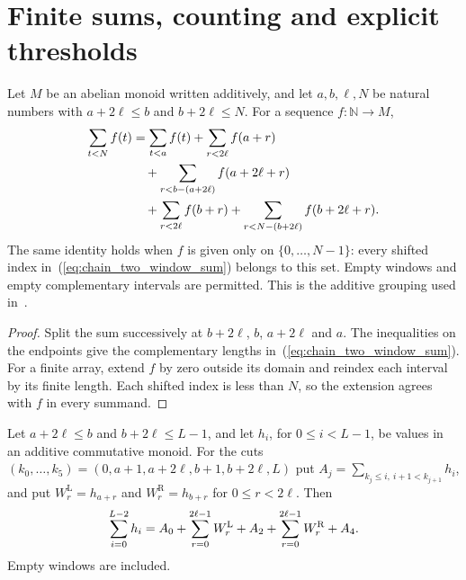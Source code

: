 \section{Finite sums, counting and explicit thresholds}

\begin{lemma}
    \label{thm:chain_two_window_sum}
    \leanok
    Let $M$ be an abelian monoid written additively, and let
    $a,b,\ell,N$ be natural numbers with $a+2\ell\le b$ and
    $b+2\ell\le N$. For a sequence $f:\mathbb N\to M$,
    \begin{align}
        \sum_{t<N}f(t)
         & =\sum_{t<a}f(t)+\sum_{r<2\ell}f(a+r)\notag   \\
         & \quad+\sum_{r<b-(a+2\ell)}f(a+2\ell+r)\notag \\
         & \quad+\sum_{r<2\ell}f(b+r)
        +\sum_{r<N-(b+2\ell)}f(b+2\ell+r).
        \label{eq:chain_two_window_sum}
    \end{align}
    The same identity holds when $f$ is given only on
    $\{0,\ldots,N-1\}$: every shifted index in~(\ref{eq:chain_two_window_sum})
    belongs to this set. Empty windows and empty complementary intervals
    are permitted. This is the additive grouping used
    in~\cite[Section~4.1]{Arad2016RigorousRG}.
\end{lemma}

\begin{proof}\leanok
    Split the sum successively at $b+2\ell$, $b$, $a+2\ell$ and $a$.
    The inequalities on the endpoints give the complementary lengths
    in~(\ref{eq:chain_two_window_sum}). For a finite array, extend $f$ by zero
    outside its domain and reindex each interval by its finite length.
    Each shifted index is less than $N$, so the extension agrees with $f$
    in every summand.
\end{proof}

\begin{lemma}
    \label{thm:actual_two_window_alphabet_sum}
    \leanok
    Let $a+2\ell\le b$ and $b+2\ell\le L-1$, and let $h_i$, for
    $0\le i<L-1$, be values in an additive commutative monoid. For the cuts
    $(k_0,\ldots,k_5)=(0,a+1,a+2\ell,b+1,b+2\ell,L)$ put
    $A_j=\sum_{k_j\le i,\ i+1<k_{j+1}}h_i$, and put $W_r^{\mathrm L}=h_{a+r}$
    and $W_r^{\mathrm R}=h_{b+r}$ for $0\le r<2\ell$. Then
    \begin{align}
        \sum_{i=0}^{L-2}h_i
        =A_0+\sum_{r=0}^{2\ell-1}W_r^{\mathrm L}
        +A_2+\sum_{r=0}^{2\ell-1}W_r^{\mathrm R}+A_4.
        \notag
    \end{align}
    Empty windows are included.
\end{lemma}

